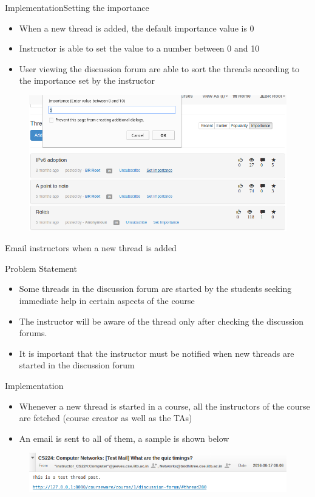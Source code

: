 \documentclass[xcolor=table]{beamer}
\begin{document}
\begin{frame}{Implementation}{Setting the importance}
	\begin{itemize}
		\item When a new thread is added, the default importance value is 0
		\item Instructor is able to set the value to a  number between 0 and 10
		\item User viewing the discussion forum are able to sort the threads according to the importance set by the instructor
	\end{itemize}
	\begin{figure}
	\centering
	\includegraphics[width=0.7\linewidth]{./media/thread_imp}
	\label{fig:thread_imp}
	\end{figure}
\end{frame}

\begin{frame}{Email instructors when a new thread is added}
\begin{block}{Problem Statement}
	\begin{itemize}
	\item Some threads in the discussion forum are started by the students seeking immediate help in certain aspects of the course
	\item The instructor will be aware of the thread only after checking the discussion forums.
	\item It is important that the instructor must be notified when new threads are started in the discussion forum
	\end{itemize}
\end{block}
\end{frame}

\begin{frame}{Implementation}
	\begin{itemize}
		\item Whenever a new thread is started in a course, all the instructors of the course are fetched (course creator as well as the TAs)
		\item An email is sent to all of them, a sample is shown below
	\end{itemize}
	\begin{figure}
	\centering
	\includegraphics[width=0.9\linewidth]{./media/email_inst}
	\label{fig:email_inst}
	\end{figure}
\end{frame}
\end{document}
